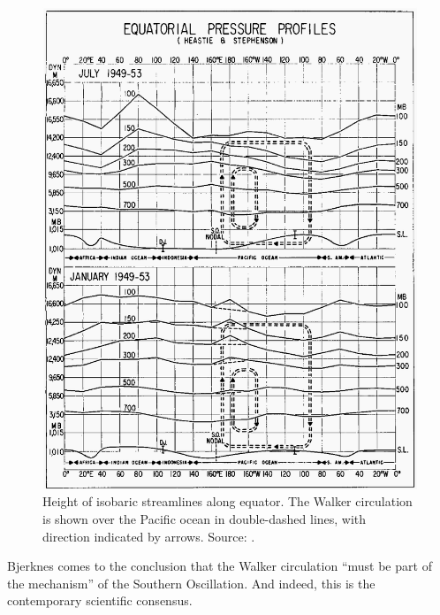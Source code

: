 \begin{figure}[t]
  \centering
  \includegraphics[width=0.9\linewidth]{figures/equatorial-pressure-profiles.png}
  \caption{Height of isobaric streamlines along equator. The Walker
      circulation is shown over the Pacific ocean in double-dashed lines, with
    direction indicated by arrows. Source: \citet{bjerknes1969}.}
  \label{fig:pressureprofiles}
\end{figure}

Bjerknes comes to the conclusion that the Walker circulation ``must be part of
the mechanism'' of the Southern Oscillation. And indeed, this is the
contemporary scientific consensus.



